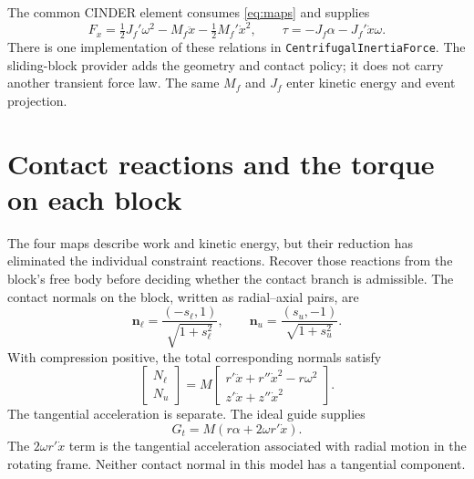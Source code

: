 \documentclass[11pt,letterpaper]{article}
\numberwithin{equation}{section}
\newcommand{\half}{\tfrac12}
\begin{document}
The common CINDER element \cite{common} consumes \cref{eq:maps} and supplies
\begin{equation}
 F_x=\half J_f'\omega^2-M_f\ddot x-\half M_f'\dot x^2,
 \qquad \tau=-J_f\alpha-J_f'\dot x\omega.
 \label{eq:loads}
\end{equation}
There is one implementation of these relations in
\texttt{CentrifugalInertiaForce}. The sliding-block provider adds the geometry
and contact policy; it does not carry another transient force law. The same
$M_f$ and $J_f$ enter kinetic energy and event projection.

\section{Contact reactions and the torque on each block}
\label{sec:wrench}

The four maps describe work and kinetic energy, but their reduction has
eliminated the individual constraint reactions. Recover those reactions from
the block's free body before deciding whether the contact branch is admissible.
The contact normals on the block, written as radial--axial pairs, are
\begin{equation}
 \bm n_\ell=\frac{(-s_\ell,1)}{\sqrt{1+s_\ell^2}},\qquad
 \bm n_u=\frac{(s_u,-1)}{\sqrt{1+s_u^2}}.
\end{equation}
With compression positive, the total corresponding normals satisfy
\begin{equation}
 [\bm n_\ell\ \bm n_u]
 \begin{bmatrix}N_\ell\\N_u\end{bmatrix}
 =M\begin{bmatrix}
 r'\ddot x+r''\dot x^2-r\omega^2\\
 z'\ddot x+z''\dot x^2
 \end{bmatrix}.
 \label{eq:normals}
\end{equation}
The tangential acceleration is separate. The ideal guide supplies
\begin{equation}
 G_t=M(r\alpha+2\omega r'\dot x).
 \label{eq:guide-force}
\end{equation}
The $2\omega r'\dot x$ term is the tangential acceleration associated with
radial motion in the rotating frame. Neither contact normal in this model has
a tangential component.
\end{document}
